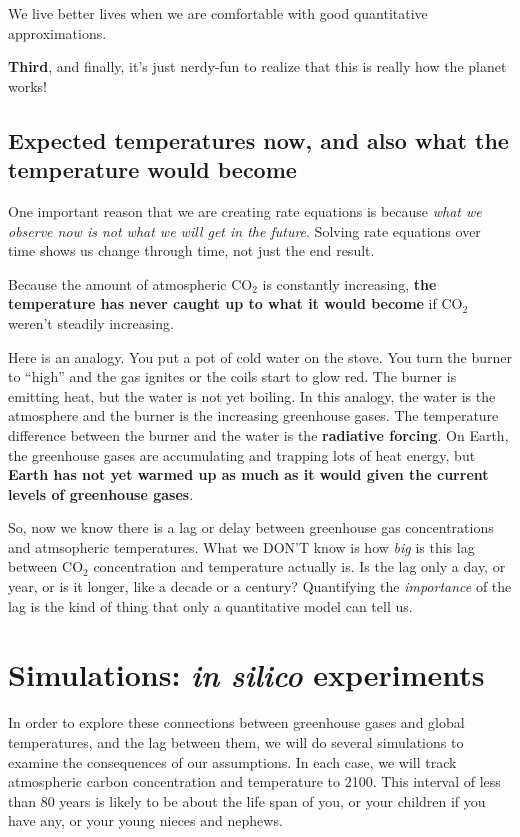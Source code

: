\documentclass[
  letterpaper,
  DIV=11,
  numbers=noendperiod]{scrreprt}
\begin{document}
We live better lives when we are comfortable with good quantitative
approximations.

\textbf{Third}, and finally, it's just nerdy-fun to realize that this is
really how the planet works!

\subsection{Expected temperatures now, and also what the temperature
would
become}\label{expected-temperatures-now-and-also-what-the-temperature-would-become}

One important reason that we are creating rate equations is because
\emph{what we observe now is not what we will get in the future}.
Solving rate equations over time shows us change through time, not just
the end result.

Because the amount of atmospheric CO\(_2\) is constantly increasing,
\textbf{the temperature has never caught up to what it would become} if
CO\(_2\) weren't steadily increasing.

Here is an analogy. You put a pot of cold water on the stove. You turn
the burner to ``high'' and the gas ignites or the coils start to glow
red. The burner is emitting heat, but the water is not yet boiling. In
this analogy, the water is the atmosphere and the burner is the
increasing greenhouse gases. The temperature difference between the
burner and the water is the \textbf{radiative forcing}. On Earth, the
greenhouse gases are accumulating and trapping lots of heat energy, but
\textbf{Earth has not yet warmed up as much as it would given the
current levels of greenhouse gases}.

So, now we know there is a lag or delay between greenhouse gas
concentrations and atmsopheric temperatures. What we DON'T know is how
\emph{big} is this lag between CO\(_2\) concentration and temperature
actually is. Is the lag only a day, or year, or is it longer, like a
decade or a century? Quantifying the \emph{importance} of the lag is the
kind of thing that only a quantitative model can tell us.

\section{\texorpdfstring{Simulations: \emph{in silico}
experiments}{Simulations: in silico experiments}}\label{simulations-in-silico-experiments}

In order to explore these connections between greenhouse gases and
global temperatures, and the lag between them, we will do several
simulations to examine the consequences of our assumptions. In each
case, we will track atmospheric carbon concentration and temperature to
2100. This interval of less than 80 years is likely to be about the life
span of you, or your children if you have any, or your young nieces and
nephews.
\end{document}
